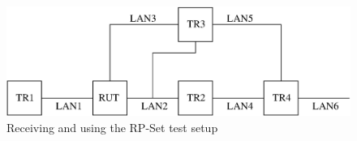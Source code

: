 \documentclass[11pt]{report}
\begin{document}
\begin{figure}[htbp]
  \begin{center}
    \includegraphics[scale=0.8]{figs/pim_test_6_6_receiving_and_using_the_rp_set}
    \caption{Receiving and using the RP-Set test setup}
    \label{fig:pim_test_6_6_receiving_and_using_the_rp_set}
  \end{center}
\end{figure}


\end{document}
